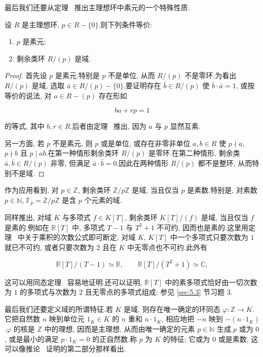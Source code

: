 最后我们还要从定理~ 推出主理想环中素元的一个特殊性质.

\begin{corollary}\label{cor:5.2.17}
设 $R$ 是主理想环, $p \in R - \{0\}$.则下列条件等价:
\begin{enumerate}
\item[(i)] $p$ 是素元;
\item[(ii)] 剩余类环 $R/(p)$ 是域.
\end{enumerate}
\end{corollary}

\begin{proof}
首先设 $p$ 是素元.特别是 $p$ 不是单位, 从而 $R/(p)$ 不是零环.为看出 $R/(p)$ 是域, 选取 $\bar{a} \in R/(p) - \{0\}$.要证明存在 $\bar{b} \in R/(p)$ 使 $\bar{b} \cdot \bar{a} = 1$, 或按等价的说法, 对 $a \in R - (p)$ 存在形如

\[
ba + rp = 1
\]

的等式, 其中 $b, r \in R$.后者由定理~ 推出, 因为 $a$ 与 $p$ 显然互素.

另一方面, 若 $p$ 不是素元, 则 $p$ 或是单位, 或存在非零非单位 $a, b \in R$ 使 $p \nmid a$, $p \nmid b$ 且 $p \mid ab$.在第一种情形剩余类环 $R/(p)$ 是零环.在第二种情形, 剩余类 $\bar{a}, \bar{b} \in R/(p)$ 非零, 但满足 $\bar{a} \cdot \bar{b} = 0$.因此在两种情形 $R/(p)$ 都不是整环, 从而特别不是域.
\end{proof}

作为应用看到, 对 $p \in \mathbb{Z}$, 剩余类环 $\mathbb{Z}/p\mathbb{Z}$ 是域, 当且仅当 $p$ 是素数.特别是, 对素数 $p \in \mathbb{N}$, $\mathbb{F}_p = \mathbb{Z}/p\mathbb{Z}$ 是含 $p$ 个元素的域.

同样推出, 对域 $K$ 与多项式 $f \in K[T]$, 剩余类环 $K[T]/(f)$ 是域, 当且仅当 $f$ 是素的.例如在 $\mathbb{R}[T]$ 中, 多项式 $T - 1$ 与 $T^2 + 1$ 不可约, 因而也是素的.这里用定理~ 中关于乘积的次数公式即可断定, 对域 $K$, $K[T]$ 中一个多项式只要次数为 $1$ 就已不可约, 或者只要次数为 $2$ 且在 $K$ 中无零点也不可约.此外有

\[
\mathbb{R}[T]/(T - 1) \simeq \mathbb{R}, \qquad \mathbb{R}[T]/(T^2 + 1) \simeq \mathbb{C},
\]

这可以用同态定理~ 容易地证明.还可以证明, $\mathbb{R}[T]$ 中的素多项式恰好由一切次数为 $1$ 的多项式与次数为 $2$ 且无零点的多项式组成; 参见 \ref{sec:5.3} 节习题 3.

最后我们还要定义域的所谓特征.若 $K$ 是域, 则存在唯一确定的环同态 $\varphi \colon \mathbb{Z} \longrightarrow K$.它把自然数 $n$ 映到单位元 $1_K \in K$ 的 $n$ 重和 $n \cdot 1_K$, 相应地把 $-n$ 映到 $-(n \cdot 1_K)$.$\varphi$ 的核是 $\mathbb{Z}$ 中的理想, 因而是主理想, 从而由唯一确定的元素 $p \in \mathbb{N}$ 生成.$p$ 或为 $0$, 或是最小的满足 $p \cdot 1_K = 0$ 的正自然数.称 $p$ 为 $K$ 的特征; 它或为 $0$ 或是素数, 这可以像推论~ 证明的第二部分那样看出.

